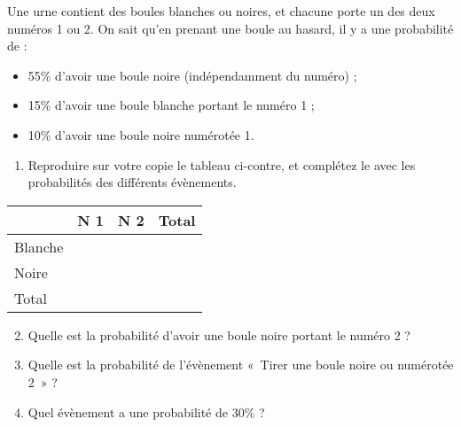 \documentclass[11pt]{article}
\begin{document}
\begin{exercice}
  Une urne contient des boules blanches ou noires, et chacune porte un des deux numéros 1 ou 2. On sait qu'en prenant une boule au hasard, il y a une probabilité de :
  \begin{itemize}[$\bullet$]
    \item 55\% d'avoir une boule noire (indépendamment du numéro) ;
    \item 15\% d'avoir une boule blanche portant le numéro 1 ;
    \item 10\% d'avoir une boule noire numérotée 1.
  \end{itemize}

  \begin{multicols}{2}
  \begin{enumerate}
    \item Reproduire sur votre copie le tableau ci-contre, et complétez le avec les probabilités des différents évènements.
  \end{enumerate}

  \columnbreak

  \begin{center}
  \begin{tabular}{p{1.2cm}|p{0.8cm}|p{0.8cm}|p{0.9cm}}
  & N\up{o} 1 & N\up{o} 2 & Total \\
  \hline
  Blanche & & & \\
  \hline
  Noire   & & & \\
  \hline
  Total   & & & \\
\end{tabular}
\end{center}
\end{multicols}
\begin{enumerate}
    \setcounter{enumi}{1}
    \item Quelle est la probabilité d'avoir une boule noire portant le numéro 2 ?
    \item Quelle est la probabilité de l'évènement «~Tirer une boule noire ou numérotée 2~» ?
    \item Quel évènement a une probabilité de 30\% ?
  \end{enumerate}
\end{exercice}
\end{document}
